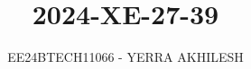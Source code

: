 \documentclass[journal]{IEEEtran}
\begin{document}

\vspace{3cm}

\title{2024-XE-27-39}
\author{EE24BTECH11066 - YERRA AKHILESH}
{\let\newpage\relax\maketitle}

\renewcommand{\thefigure}{\theenumi}
\renewcommand{\thetable}{\theenumi}
\setlength{\intextsep}{10pt} %

\renewcommand{\thetable}{\theenumi}
\end{document}

